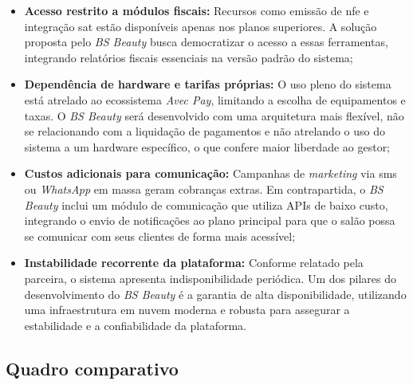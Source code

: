 \begin{itemize}
	   \item \textbf{Acesso restrito a módulos fiscais:} Recursos como emissão de \gls{nfe} e integração \gls{sat} estão disponíveis apenas nos planos superiores. A solução proposta pelo \emph{BS Beauty} busca democratizar o acesso a essas ferramentas, integrando relatórios fiscais essenciais na versão padrão do sistema;
	
	
	\item \textbf{Dependência de hardware e tarifas próprias:} O uso pleno do sistema está atrelado ao ecossistema \emph{Avec Pay}, limitando a escolha de equipamentos e taxas. O \emph{BS Beauty} será desenvolvido com uma arquitetura mais flexível, não se relacionando com a liquidação de pagamentos e não atrelando o uso do sistema a um hardware específico, o que confere maior liberdade ao gestor;
	
	
	\item \textbf{Custos adicionais para comunicação:} Campanhas de \emph{marketing} via \gls{sms} ou \emph{WhatsApp} em massa geram cobranças extras. Em contrapartida, o \emph{BS Beauty} inclui um módulo de comunicação que utiliza APIs de baixo custo, integrando o envio de notificações ao plano principal para que o salão possa se comunicar com seus clientes de forma mais acessível;
	
	\item \textbf{Instabilidade recorrente da plataforma:} Conforme relatado pela parceira, o sistema apresenta indisponibilidade periódica. Um dos pilares do desenvolvimento do \emph{BS Beauty} é a garantia de alta disponibilidade, utilizando uma infraestrutura em nuvem moderna e robusta para assegurar a estabilidade e a confiabilidade da plataforma.
\end{itemize}


\subsection{Quadro comparativo}

